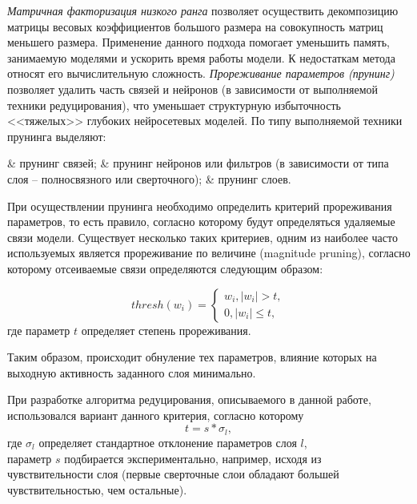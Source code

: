 \textit{Матричная факторизация низкого ранга} позволяет осуществить декомпозицию матрицы весовых коэффициентов большого размера на совокупность матриц меньшего размера. Применение данного подхода помогает уменьшить память, занимаемую моделями и ускорить время работы модели. К недостаткам метода относят его вычислительную сложность.
\textit{Прореживание параметров (прунинг)} позволяет удалить часть связей и нейронов (в зависимости от выполняемой техники редуцирования), что уменьшает структурную избыточность <<тяжелых>> глубоких нейросетевых моделей.
По типу выполняемой техники прунинга выделяют:

\begin{easylist}
	& прунинг связей;
	& прунинг нейронов или фильтров (в зависимости от типа слоя -- полносвязного или сверточного);
	& прунинг слоев.
\end{easylist}

При осуществлении прунинга необходимо определить критерий прореживания параметров, то есть правило, согласно которому будут определяться удаляемые связи модели. 
Существует несколько таких критериев, одним из наиболее часто используемых является прореживание по величине (magnitude pruning), согласно которому отсеиваемые связи определяются следующим образом:
 
\begin{equation*}
	thresh(w_i) = 
	\begin{cases}
		w_i, |w_i| > t,\\
		0, |w_i| \leq t,
	\end{cases}
\end{equation*}
где параметр $t$ определяет степень прореживания.

Таким образом, происходит обнуление тех параметров, влияние которых на выходную активность заданного слоя минимально.

При разработке алгоритма редуцирования, описываемого в данной работе, использовался вариант данного критерия, согласно которому 
\begin{equation}
	\label{eq:reduction_param}
	t = s * \sigma_l,	
\end{equation}
где $\sigma_l$ определяет стандартное отклонение параметров слоя $l$,\\
параметр $s$ подбирается экспериментально, например, исходя из чувствительности слоя (первые сверточные слои обладают большей чувствительностью, чем остальные).

